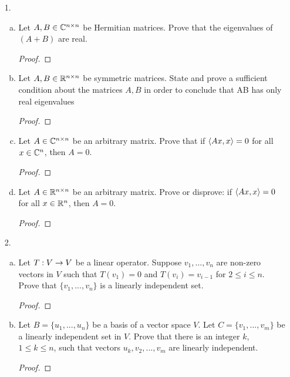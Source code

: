 
\begin{itemize}

\item[1.]
\begin{enumerate}[(a)]
    \item Let $A,B \in \mathbb{C}^{n \times n}$ be Hermitian matrices. Prove that the eigenvalues of
    $(A + B)$ are real.
    \begin{proof}

    \end{proof}
    
    \item Let $A,B \in \mathbb{R}^{n \times n}$ be symmetric matrices. State and prove a sufficient condition about the matrices $A, B$ in order to conclude that AB has only real eigenvalues
    \begin{proof}
    
    \end{proof}
    
    \item Let $A \in \mathbb{C}^{n \times n}$ be an arbitrary matrix. Prove that if $\langle{}Ax,x\rangle = 0$ for all $x \in \mathbb{C}^{n}$, then $A = 0$.
    \begin{proof}
    
    \end{proof}
    
    \item Let $A \in \mathbb{R}^{n \times n}$ be an arbitrary matrix. Prove or disprove: if $\langle{}Ax,x\rangle = 0$ for all $x \in \mathbb{R}^{n}$, then $A = 0$.
    \begin{proof}
    
    \end{proof}
\end{enumerate}





\item[2.]
\begin{enumerate}[(a)]
    \item Let $T : V \rightarrow V$ be a linear operator. Suppose $v_1, ..., v_n$ are non-zero vectors in $V$ such that $T(v_1) = 0$ and $T(v_i) = v_{i-1}$ for $2 \leq i \leq n$. Prove that $\{v_1, ..., v_n\}$ is a linearly independent set.
    \begin{proof}

    \end{proof}

    \item Let $B = \{u_1, . . . , u_n\}$ be a basis of a vector space $V$. Let $C =\{v_1, . . . , v_m\}$ be a linearly independent set in $V$. Prove that there is an integer $k$, $1 \leq k \leq n$, such that vectors $u_k, v_2, . . . , v_m$ are linearly independent.
    \begin{proof}


\end{proof}
\end{enumerate}
\end{itemize}
